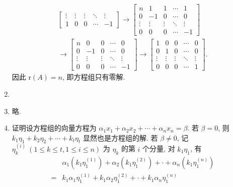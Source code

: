 \documentclass[a4paper, 11pt]{ctexart}
\newcommand{\rank}{\mathrm{r}}
\begin{document}
\begin{enumerate}
\begin{gather*}
\begin{bmatrix}
                \vdots & \vdots & \vdots & \ddots & \vdots \\
                1 & 0 & 0 & \cdots & -1
            \end{bmatrix}
            \rightarrow
            \begin{bmatrix}
                n & 1 & 1 & \cdots & 1 \\
                0 & -1 & 0 & \cdots & 0 \\
                \vdots & \vdots & \vdots & \ddots & \vdots \\
                0 & 0 & 0 & \cdots & -1
            \end{bmatrix} \\
            \rightarrow
            \begin{bmatrix}
                n & 0 & 0 & \cdots & 0 \\
                0 & -1 & 0 & \cdots & 0 \\
                \vdots & \vdots & \vdots & \ddots & \vdots \\
                0 & 0 & 0 & \cdots & -1
            \end{bmatrix}
            \rightarrow
            \begin{bmatrix}
                1 & 0 & 0 & \cdots & 0 \\
                0 & 1 & 0 & \cdots & 0 \\
                \vdots & \vdots & \vdots & \ddots & \vdots \\
                0 & 0 & 0 & \cdots & 1
            \end{bmatrix}.
        \end{gather*}
        因此 $\rank(A) = n$, 即方程组只有零解.
    \item %
    \item %
        略.
    \item %
        {\heiti 证明}\quad 设方程组的向量方程为 $\alpha_1x_1 + \alpha_2x_2 + \cdots + \alpha_nx_n = \beta$.
        若 $\beta = 0$, 则 $k_1\eta_1 + k_2\eta_2 + \cdots + k_t\eta_t$ 显然也是方程组的解.
        若 $\beta \neq 0$, 记 $\eta_k^{(i)}\ (1 \leqslant k \leqslant t, 1\leqslant i\leqslant n)$ 为 $\eta_k$ 的第 $i$ 个分量, 对 $k_1\eta_1$, 有
        \begin{align*}
            & \alpha_1(k_1\eta_1^{(1)}) + \alpha_2(k_1\eta_1^{(2)}) + \cdot + \alpha_n(k_1\eta_1^{(n)}) \\
            ={} & k_1\alpha_1\eta_1^{(1)} + k_1\alpha_2\eta_1^{(2)} + \cdot + k_1\alpha_n\eta_1^{(n)} \\

\end{align*}
\end{enumerate}
\end{document}

